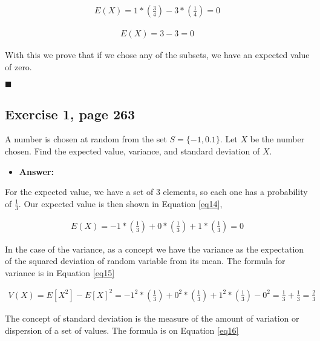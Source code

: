 \documentclass{article}
\begin{document}
 \begin{eqnarray}
\label{eq12}
E(X) = 1* \left(\frac{3}{4}\right) - 3* \left(\frac{1}{4}\right) = 0
\end{eqnarray}

 \begin{eqnarray}
\label{eq13}
E(X) = 3 - 3 = 0
\end{eqnarray}
 
 
 With this we prove that if we chose any of the subsets, we have an expected value of zero.\\
 
\begin{flushright}
$\blacksquare$
\end{flushright}

\subsection{Exercise 1, page 263}

A number is chosen at random from the set $S = \{-1,0.1\}$. Let $X$ be the number chosen. Find the expected value, variance, and standard deviation of $X$.\\

\begin{itemize}
\item \textbf{Answer:}
\end{itemize}

For the expected value, we have a set of 3 elements, so each one has a probability of $\frac{1}{3}$. Our expected value is then shown in Equation \ref{eq14},

 \begin{eqnarray}
\label{eq14}
E(X) = -1* \left(\frac{1}{3}\right)  + 0 * \left(\frac{1}{3}\right) + 1* \left(\frac{1}{3}\right) = 0
\end{eqnarray}

In the case of the variance, as a concept we have the variance as the expectation of the squared deviation of random variable from its mean. The formula for variance is in Equation \ref{eq15}

 \begin{eqnarray}
\label{eq15}
V(X) = E[X^2] - E[X]^2 = -1^2* \left(\frac{1}{3}\right)  + 0^2 * \left(\frac{1}{3}\right) + 1^2* \left(\frac{1}{3}\right) - 0^2 = \frac{1}{3} + \frac{1}{3} = \frac{2}{3}
\end{eqnarray}

The concept of standard deviation is the measure of the amount of variation or dispersion of a set of values. The formula is on Equation \ref{eq16}
\end{document}
